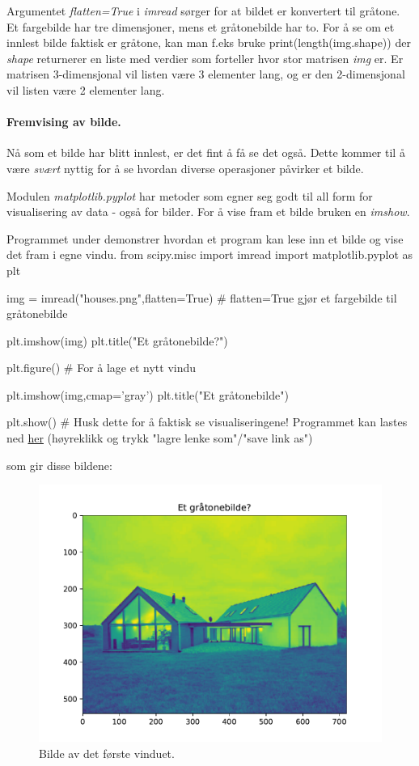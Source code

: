 \documentclass[%
oneside,                 %
final,                   %
10pt]{article}
\begin{document}
Argumentet \emph{flatten=True} i \emph{imread} sørger for at bildet er konvertert til gråtone. Et fargebilde har tre dimensjoner, mens et gråtonebilde har to.
For å se om et innlest bilde faktisk er gråtone, kan man f.eks bruke
\bccq
print(length(img.shape))
\eccq
der \emph{shape} returnerer en liste med verdier som forteller hvor stor matrisen \emph{img} er. Er matrisen 3-dimensjonal vil listen være 3 elementer lang, og er den 2-dimensjonal vil listen være 2 elementer lang.

\paragraph{Fremvising av bilde.}
Nå som et bilde har blitt innlest, er det fint å få se det også. Dette kommer til å være \emph{svært} nyttig for å se hvordan diverse operasjoner påvirker et bilde.

Modulen \emph{matplotlib.pyplot} har metoder som egner seg godt til all form for visualisering av data - også for bilder. For å vise fram et bilde bruken en \emph{imshow}.

Programmet under demonstrer hvordan et program kan lese inn et bilde og vise det fram i egne vindu.
\bpypro
from scipy.misc import imread
import matplotlib.pyplot as plt

img = imread("houses.png",flatten=True) # flatten=True gjør et fargebilde til gråtonebilde

plt.imshow(img)
plt.title("Et gråtonebilde?")

plt.figure() # For å lage et nytt vindu

plt.imshow(img,cmap='gray')
plt.title("Et gråtonebilde")

plt.show() # Husk dette for å faktisk se visualiseringene!
\epypro
Programmet kan lastes ned \href{{https://github.com/krisbhei/INF2310/raw/master/Programmering/Python/fremvising.py}}{her} (høyreklikk og trykk "lagre lenke som"/"save link as")

som gir disse bildene:


\begin{figure}[!ht]  %
  \centerline{\includegraphics[width=0.9\linewidth]{Figure_1.pdf}}
  \caption{
  Bilde av det første vinduet.
  }
\end{figure}
\end{document}

